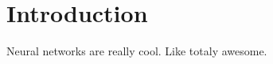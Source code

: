 \documentclass{subfile}
\begin{document}
\section{Introduction}
\begin{multicols}{2}
Neural networks are really cool. Like totaly awesome.
\end{multicols}
\end{document}
